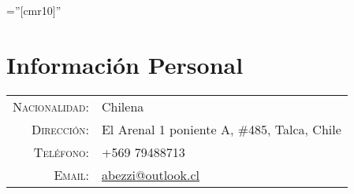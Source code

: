 \documentclass[a4paper,10pt]{article} %
\begin{document}
\pagestyle{empty} %

\font\fb=''[cmr10]'' %


\par{\bigskip\par} %

\section{Informaci\'on Personal}

\begin{tabular}{rl}
\textsc{Nacionalidad:} & Chilena \\
\textsc{Direcci\'on:} & El Arenal 1 poniente A, \#485, Talca, Chile \\
\textsc{Tel\'efono:} & +569 79488713\\
\textsc{Email:} & \href{mailto:abezzi@outlook.cl}{abezzi@outlook.cl}
\end{tabular}




\end{document}
